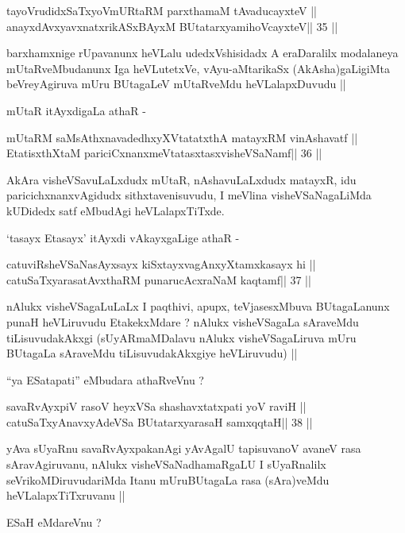 \begin{shl}
tayoVrudidxSaTxyoVmURtaRM parxthamaM tAvaducayxteV ||
anayxdAvxyavxnatxrikASxBAyxM BUtatarxyamihoVcayxteV\hfill || 35 ||
\end{shl}

\begin{artha}
barxhamxnige rUpavanunx heVLalu udedxVshisidadx A eraDaralilx
modalaneya mUtaRveMbudanunx Iga heVLutetxVe, vAyu-aMtarikaSx
(AkAsha)gaLigiMta beVreyAgiruva mUru BUtagaLeV mUtaRveMdu
heVLalapxDuvudu ||

mUtaR itAyxdigaLa athaR -
\end{artha}

\begin{shl}
mUtaRM saMsAthxnavadedhxyXVtatatxthA matayxRM vinAshavatf ||
EtatisxthXtaM pariciCxnanxmeVtatasxtasxvisheVSaNamf\hfill || 36 ||
\end{shl}

\begin{artha}
AkAra visheVSavuLaLxdudx mUtaR, nAshavuLaLxdudx matayxR, idu
paricichxnanxvAgidudx sithxtavenisuvudu, I meVlina visheVSaNagaLiMda
kUDidedx satf eMbudAgi heVLalapxTiTxde.

`tasayx Etasayx' itAyxdi vAkayxgaLige athaR -
\end{artha}

\begin{shl}
\footnotemark[1]catuviRsheVSaNasAyxsayx kiSxtayxvagAnxyXtamxkasayx hi ||
\footnotemark[1]catuSaTxyarasatAvxthaRM punarucAcxraNaM kaqtamf\hfill || 37 ||
\end{shl}

\begin{artha}
nAlukx visheVSagaLuLaLx I paqthivi, apupx, teVjasesxMbuva BUtagaLanunx
punaH heVLiruvudu EtakekxMdare ? nAlukx visheVSagaLa sAraveMdu
tiLisuvudakAkxgi  (sUyARmaMDalavu nAlukx visheVSagaLiruva mUru
BUtagaLa sAraveMdu tiLisuvudakAkxgiye heVLiruvudu) ||

``ya ESatapati'' eMbudara athaRveVnu ?
\end{artha}

\begin{shl}
savaRvAyxpiV rasoV heyxVSa shashavxtatxpati yoV raviH ||
\footnotemark[1]catuSaTxyAnavxyAdeVSa BUtatarxyarasaH samxqqtaH\hfill || 38 ||
\end{shl}

\begin{artha}
yAva sUyaRnu savaRvAyxpakanAgi yAvAgalU tapisuvanoV avaneV rasa
sAravAgiruvanu, nAlukx visheVSaNadhamaRgaLU I sUyaRnalilx
seVrikoMDiruvudariMda Itanu mUruBUtagaLa rasa (sAra)veMdu
heVLalapxTiTxruvanu ||

ESaH eMdareVnu ?
\end{artha}

